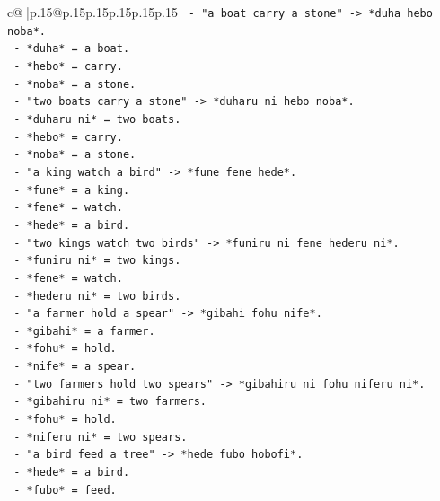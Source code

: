 \documentclass{article}
\begin{document}
{\begin{supertabular}{c@{$\;$}|p{.15\linewidth}@{}p{.15\linewidth}p{.15\linewidth}p{.15\linewidth}p{.15\linewidth}p{.15\linewidth}}
{{{\texttt{            {-} "a boat carry a stone" {-}> *duha hebo noba*.} \\
\texttt{              {-} *duha* = a boat.} \\
\texttt{              {-} *hebo* = carry.} \\
\texttt{              {-} *noba* = a stone.} \\
\texttt{            {-} "two boats carry a stone" {-}> *duharu ni hebo noba*.} \\
\texttt{              {-} *duharu ni* = two boats.} \\
\texttt{              {-} *hebo* = carry.} \\
\texttt{              {-} *noba* = a stone.} \\
\texttt{            {-} "a king watch a bird" {-}> *fune fene hede*.} \\
\texttt{              {-} *fune* = a king.} \\
\texttt{              {-} *fene* = watch.} \\
\texttt{              {-} *hede* = a bird.} \\
\texttt{            {-} "two kings watch two birds" {-}> *funiru ni fene hederu ni*.} \\
\texttt{              {-} *funiru ni* = two kings.} \\
\texttt{              {-} *fene* = watch.} \\
\texttt{              {-} *hederu ni* = two birds.} \\
\texttt{            {-} "a farmer hold a spear" {-}> *gibahi fohu nife*.} \\
\texttt{              {-} *gibahi* = a farmer.} \\
\texttt{              {-} *fohu* = hold.} \\
\texttt{              {-} *nife* = a spear.} \\
\texttt{            {-} "two farmers hold two spears" {-}> *gibahiru ni fohu niferu ni*.} \\
\texttt{              {-} *gibahiru ni* = two farmers.} \\
\texttt{              {-} *fohu* = hold.} \\
\texttt{              {-} *niferu ni* = two spears.} \\
\texttt{            {-} "a bird feed a tree" {-}> *hede fubo hobofi*.} \\
\texttt{              {-} *hede* = a bird.} \\
\texttt{              {-} *fubo* = feed.} \\
}}}
\end{supertabular}}
\end{document}
